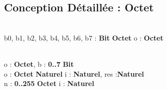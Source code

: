 \subsection{Conception Détaillée : Octet}

\begin{algorithme}
    \\
    {b0, b1, b2, b3, b4, b5, b6, b7 : \textbf{Bit}}
    {\textbf{Octet}}
    {}
    {o : \textbf{Octet}}
    {  		
        
    }
    \\
    {o : \textbf{Octet}, b : \textbf{0..7}}
    {\textbf{Bit}}
    {}
    {}
    {
    }
 	\\
    {o : \textbf{Octet}}
    {\textbf{Naturel}}
    {}
    {i : \textbf{Naturel}, res :\textbf{Naturel} }
	{   
    {
    }
    }  
    \\
    {n : \textbf{0..255}}
    {\textbf{Octet}}
    {}{i : \textbf{Naturel}}
    { 
		{
      }
    }
\end{algorithme}
